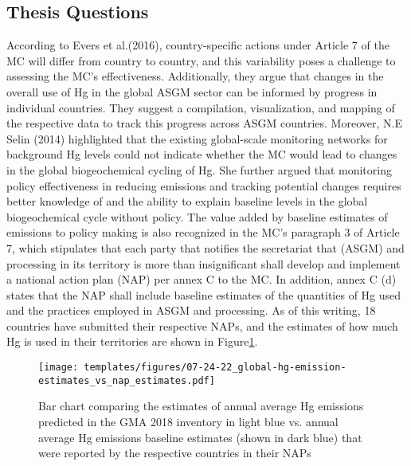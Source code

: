 \begin{flushleft}


\section{Thesis Questions}
According to Evers et al.(2016), country-specific actions under Article 7 of the MC will differ from country to country, and this variability poses a challenge to assessing the MC's effectiveness. Additionally, they argue that changes in the overall use of Hg in the global ASGM sector can be informed by progress in individual countries. They suggest a compilation, visualization, and mapping of the respective data to track this progress across ASGM countries. Moreover, N.E Selin (2014) highlighted that the existing global-scale monitoring networks for background Hg levels could not indicate whether the MC would lead to changes in the global biogeochemical cycling of Hg. She further argued that monitoring policy effectiveness in reducing emissions and tracking potential changes requires better knowledge of and the ability to explain baseline levels in the global biogeochemical cycle without policy. The value added by baseline estimates of emissions to policy making is also recognized in the MC's paragraph 3 of Article 7, which stipulates that each party that notifies the secretariat that (ASGM) and processing in its territory is more than insignificant shall develop and implement a national action plan (NAP) per annex C to the MC. In addition, annex C (d) states that the NAP shall include baseline estimates of the quantities of Hg used and the practices employed in ASGM and processing. As of this writing, 18 countries have submitted their respective NAPs, and the estimates of how much Hg is used in their territories are shown in Figure\ref{fig:global-hg-emission-estimates_vs_nap_estimates}. 

\begin{figure}[H]
  \texttt{[image: templates/figures/07-24-22\_global-hg-emission-estimates\_vs\_nap\_estimates.pdf]}
  \centering
  \caption{Bar chart comparing the estimates of annual average Hg emissions predicted in the GMA 2018 inventory in light blue vs. annual average Hg emissions baseline estimates (shown in dark blue) that were reported by the respective countries in their NAPs \cite{united_nations_environment_programme_technical_2019} }
  \label{fig:global-hg-emission-estimates_vs_nap_estimates}
\end{figure}
\FloatBarrier



\end{flushleft}
